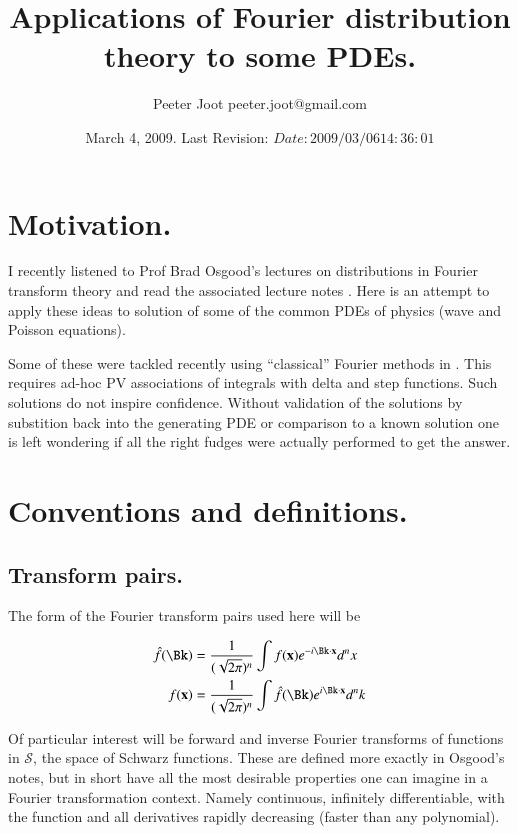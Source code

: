 \documentclass{article}
\title{ Applications of Fourier distribution theory to some PDEs. }
\author{Peeter Joot \quad peeter.joot@gmail.com }
\date{ March 4, 2009.  Last Revision: $Date: 2009/03/06 14:36:01 $ }
\newcommand{\Sw}[0]{\mathcal{S}}
\begin{document}
\maketitle{}
\tableofcontents

\section{ Motivation. }

I recently listened to Prof Brad Osgood's lectures on distributions in Fourier
transform theory and read the associated lecture notes
\cite{osgoodFourier}.  Here is an attempt to apply these ideas to solution
of some of the common PDEs of physics (wave and Poisson equations).

Some of these were tackled recently using ``classical'' Fourier methods
in \cite{PJpoisson}. 
This requires ad-hoc PV associations of integrals with delta and step
functions.  Such solutions do not inspire confidence.  Without
validation of the solutions by substition back into the generating PDE
or comparison to a known solution one is left wondering
if all the right fudges were actually performed to get the answer.

\section{ Conventions and definitions. }

\subsection{ Transform pairs. }

The form of the Fourier transform pairs used here will be

\begin{align*}
\hat{f}(\Bk) &= \frac{1}{(\sqrt{2\pi})^n} \int f(\Bx) e^{-i \Bk \cdot \Bx } d^n x \\
{f}(\Bx) &= \frac{1}{(\sqrt{2\pi})^n} \int \hat{f}(\Bk) e^{i \Bk \cdot \Bx } d^n k \\
\end{align*}

Of particular interest will be forward and inverse Fourier transforms
of functions in $\Sw$, the space of Schwarz functions.  These are defined
more exactly in Osgood's notes, but in short have all the most desirable
properties one can imagine in a Fourier transformation context.  Namely
continuous, infinitely differentiable, with the function and all 
derivatives rapidly decreasing (faster than any polynomial).
\end{document}
